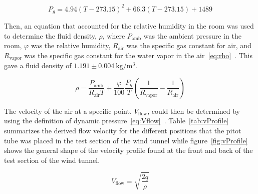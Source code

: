 \documentclass[journal,letterpaper]{IEEEtran}
\begin{document}
\begin{equation} \label{eq:PSat}
    P_g = 4.94(T - 273.15)^2 + 66.3(T - 273.15) + 1489
\end{equation}

Then, an equation that accounted for the relative humidity in the room was used to determine the fluid density, $\rho$, where $P_\text{amb}$ was the ambient pressure in the room, $\varphi$ was the relative humidity, $R_\text{air}$ was the specific gas constant for air, and $R_\text{vapor}$ was the specific gas constant for the water vapor in the air~\eqref{eq:rho}~\cite{calculator}.
This gave a fluid density of $1.191 \pm \qty{0.004}{\kg\per\m\cubed}$.

\begin{equation} \label{eq:rho}
    \rho = \frac{P_\text{amb}}{R_\text{air} T} + \frac{\varphi}{100}\frac{P_g}{T}\left(\frac{1}{R_\text{vapor}} - \frac{1}{R_\text{air}}\right)
\end{equation}

The velocity of the air at a specific point, $V_\text{flow}$, could then be determined by using the definition of dynamic pressure~\eqref{eq:Vflow}~\cite{lecture}.
Table~\ref{tab:vProfile} summarizes the derived flow velocity for the different positions that the pitot tube was placed in the test section of the wind tunnel while figure~\ref{fig:vProfile} shows the general shape of the velocity profile found at the front and back of the test section of the wind tunnel.

\begin{equation} \label{eq:Vflow}
    V_\text{flow} = \sqrt{\frac{2q}{\rho}}
\end{equation}
\end{document}
